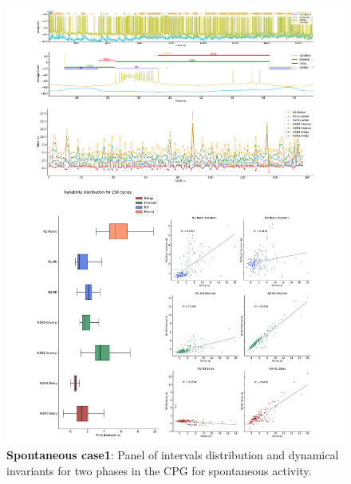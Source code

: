 \begin{figure}[htbp]
	\centering
	\includegraphics[width=1.1\textwidth]{./invariants/data/SUSSEX/prep1/images/2phases/panel_with_intervals.pdf}
	\caption{\textbf{Spontaneous case1}: Panel of intervals distribution and dynamical invariants for two phases in the CPG for spontaneous activity.}
	\label{fig:prep1 2 phases invariants}
\end{figure}
%
